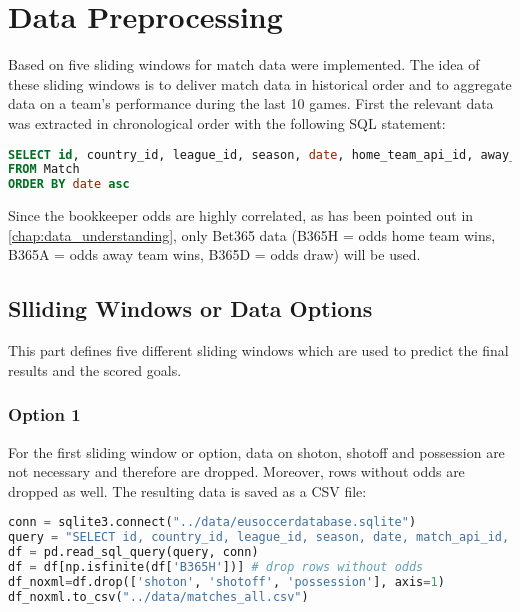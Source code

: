 
\chapter{Data Preprocessing}

Based on \cite{football-predictor} five sliding windows for match data were implemented. The idea of these sliding windows is to deliver match data in historical order and to aggregate data on a team's performance during the last 10 games.
First the relevant data was extracted in chronological order with the following SQL statement:

\begin{lstlisting}[language=SQL, caption=SQL code for Sliding Window]
SELECT id, country_id, league_id, season, date, home_team_api_id, away_team_api_id, home_team_goal, away_team_goal, B365H, B365D, B365A, shoton, shotoff, possession
FROM Match
ORDER BY date asc
\end{lstlisting}

Since the bookkeeper odds are highly correlated, as has been pointed out in \autoref{chap:data_understanding}, only Bet365 data (B365H = odds home team wins, B365A = odds away team wins, B365D = odds draw) will be used.


\section {Slliding Windows or Data Options}
This part defines five different sliding windows which are used to predict the final results and the scored goals.
\subsection {Option 1}
For the first sliding window or option, data on shoton, shotoff and possession are not necessary and therefore are dropped. Moreover, rows without odds are dropped as well. The resulting data is saved as a CSV file:


\begin{lstlisting}[language=Python, caption=Python code for matches\_all.csv]
conn = sqlite3.connect("../data/eusoccerdatabase.sqlite")
query = "SELECT id, country_id, league_id, season, date, match_api_id, home_team_api_id, away_team_api_id, home_team_goal, away_team_goal, B365H, B365D, B365A, shoton, shotoff, possession FROM Match ORDER BY date asc"
df = pd.read_sql_query(query, conn)
df = df[np.isfinite(df['B365H'])] # drop rows without odds
df_noxml=df.drop(['shoton', 'shotoff', 'possession'], axis=1)
df_noxml.to_csv("../data/matches_all.csv")
\end{lstlisting}

